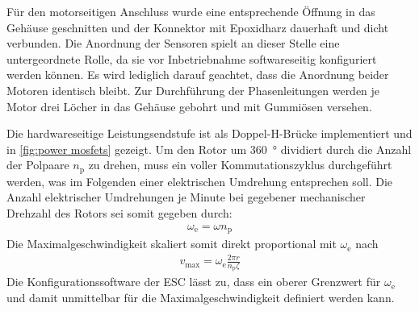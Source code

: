 	Für den motorseitigen Anschluss wurde eine entsprechende Öffnung in das Gehäuse geschnitten und der Konnektor mit Epoxidharz dauerhaft und dicht verbunden.
	Die Anordnung der Sensoren spielt an dieser Stelle eine untergeordnete Rolle, da sie vor Inbetriebnahme softwareseitig konfiguriert werden können.
	Es wird lediglich darauf geachtet, dass die Anordnung beider Motoren identisch bleibt.
	Zur Durchführung der Phasenleitungen werden je Motor drei Löcher in das Gehäuse gebohrt und mit Gummiösen versehen.\par\medskip
	Die hardwareseitige Leistungsendstufe ist als Doppel-H-Brücke implementiert und in \cref{fig:power mosfets} gezeigt.
	Um den Rotor um \qty{360}{\degree} dividiert durch die Anzahl der Polpaare \(n_\text{p}\) zu drehen, muss ein voller Kommutationszyklus durchgeführt werden, was im Folgenden einer elektrischen Umdrehung entsprechen soll.
	Die Anzahl elektrischer Umdrehungen je Minute bei gegebener mechanischer Drehzahl des Rotors sei somit gegeben durch:
	\begin{align}
		\omega_\text{e} = \omega n_\text{p}
		\label{eq:ERPM and RPM}
	\end{align}
	Die Maximalgeschwindigkeit skaliert somit direkt proportional mit \(\omega_\text{e}\) nach
	\begin{align}
		v_\text{max} = \omega_\text{e} \frac{2\pi r}{n_\text{p} \zeta}
		\label{eq:max speed by ERPM}
	\end{align}
	Die Konfigurationssoftware der ESC lässt zu, dass ein oberer Grenzwert für \(\omega_\text{e}\) und damit unmittelbar für die Maximalgeschwindigkeit definiert werden kann.


